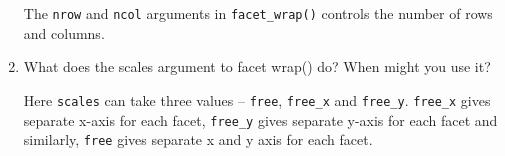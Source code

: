 \documentclass[]{book}
\begin{document}
\begin{enumerate}
  The \texttt{nrow} and \texttt{ncol} arguments in
  \texttt{facet\_wrap()} controls the number of rows and columns.
\item
  What does the scales argument to facet wrap() do? When might you use
  it?

  Here \texttt{scales} can take three values -- \texttt{free},
  \texttt{free\_x} and \texttt{free\_y}. \texttt{free\_x} gives separate
  x-axis for each facet, \texttt{free\_y} gives separate y-axis for each
  facet and similarly, \texttt{free} gives separate x and y axis for
  each facet.
\end{enumerate}


\end{document}
